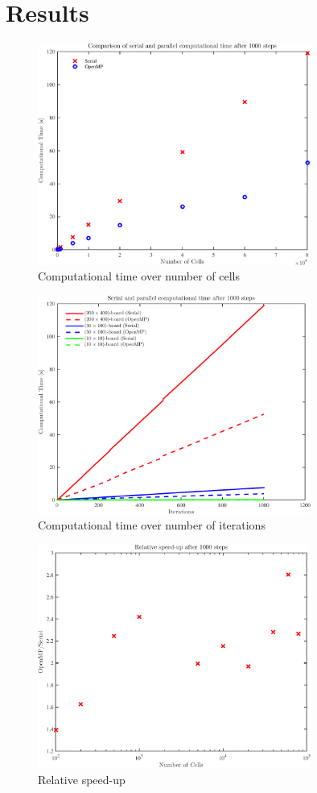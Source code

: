 \section{Results}\label{sec:results}

\begin{figure}\centering
	\includegraphics[width=0.8\textwidth]{figures/SerialOpenMP_Cells.pdf}
	\caption{Computational time over number of cells}
\end{figure}

\begin{figure}\centering
	\includegraphics[width=0.8\textwidth]{figures/SerialOpenMP_Iterations.pdf}
	\caption{Computational time over number of iterations}
\end{figure}

\begin{figure}\centering
	\includegraphics[width=0.8\textwidth]{figures/SerialOpenMP_Speedup.pdf}
	\caption{Relative speed-up}
\end{figure}